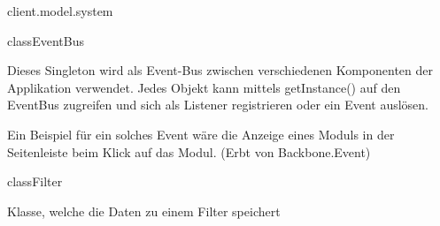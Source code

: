 \begin{texdocpackage}{client.model.system}
\begin{texdocclass}{class}{EventBus}
\label{texdoclet:edu.kit.informatik.studyplan.client.model.system.EventBus}
\begin{texdocclassintro}
Dieses Singleton wird als Event-Bus zwischen verschiedenen Komponenten der
 Applikation verwendet. Jedes Objekt kann mittels getInstance() auf den
 EventBus zugreifen und sich als Listener registrieren oder ein Event
 auslösen.\texdocbr{}

 Ein Beispiel für ein solches Event wäre die Anzeige eines Moduls in der
 Seitenleiste beim Klick auf das Modul. (Erbt von Backbone.Event)\end{texdocclassintro}
\begin{texdocclassfields}
\end{texdocclassfields}
\begin{texdocclassconstructors}
\end{texdocclassconstructors}
\begin{texdocclassmethods}
\end{texdocclassmethods}
\end{texdocclass}


\begin{texdocclass}{class}{Filter}
\label{texdoclet:edu.kit.informatik.studyplan.client.model.system.Filter}
\begin{texdocclassintro}
Klasse, welche die Daten zu einem Filter speichert\end{texdocclassintro}
\begin{texdocclassfields}
\end{texdocclassfields}
\begin{texdocclassconstructors}
\end{texdocclassconstructors}
\begin{texdocclassmethods}
\end{texdocclassmethods}
\end{texdocclass}



\end{texdocpackage}
